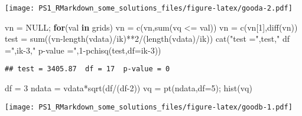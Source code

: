 \documentclass[
]{article}
\newenvironment{Shaded}{\begin{snugshade}}{\end{snugshade}}
\newcommand{\AttributeTok}[1]{\textcolor[rgb]{0.77,0.63,0.00}{#1}}
\newcommand{\ConstantTok}[1]{\textcolor[rgb]{0.00,0.00,0.00}{#1}}
\newcommand{\ControlFlowTok}[1]{\textcolor[rgb]{0.13,0.29,0.53}{\textbf{#1}}}
\newcommand{\DecValTok}[1]{\textcolor[rgb]{0.00,0.00,0.81}{#1}}
\newcommand{\FunctionTok}[1]{\textcolor[rgb]{0.00,0.00,0.00}{#1}}
\newcommand{\NormalTok}[1]{#1}
\newcommand{\OtherTok}[1]{\textcolor[rgb]{0.56,0.35,0.01}{#1}}
\newcommand{\SpecialCharTok}[1]{\textcolor[rgb]{0.00,0.00,0.00}{#1}}
\newcommand{\StringTok}[1]{\textcolor[rgb]{0.31,0.60,0.02}{#1}}
\begin{document}
\texttt{[image: PS1\_RMarkdown\_some\_solutions\_files/figure-latex/gooda-2.pdf]}

\begin{Shaded}
\begin{Highlighting}[]
\NormalTok{vn }\OtherTok{=} \ConstantTok{NULL}\NormalTok{; }\ControlFlowTok{for}\NormalTok{(val }\ControlFlowTok{in}\NormalTok{ grids) vn }\OtherTok{=} \FunctionTok{c}\NormalTok{(vn,}\FunctionTok{sum}\NormalTok{(vq }\SpecialCharTok{\textless{}=}\NormalTok{ val))}
\NormalTok{vn }\OtherTok{=} \FunctionTok{c}\NormalTok{(vn[}\DecValTok{1}\NormalTok{],}\FunctionTok{diff}\NormalTok{(vn))}
\NormalTok{test }\OtherTok{=} \FunctionTok{sum}\NormalTok{((vn}\SpecialCharTok{{-}}\FunctionTok{length}\NormalTok{(vdata)}\SpecialCharTok{/}\NormalTok{ik)}\SpecialCharTok{**}\DecValTok{2}\SpecialCharTok{/}\NormalTok{(}\FunctionTok{length}\NormalTok{(vdata)}\SpecialCharTok{/}\NormalTok{ik))}
\FunctionTok{cat}\NormalTok{(}\StringTok{"test ="}\NormalTok{,test,}\StringTok{" df ="}\NormalTok{,ik}\DecValTok{{-}3}\NormalTok{,}\StringTok{" p{-}value ="}\NormalTok{,}\DecValTok{1}\SpecialCharTok{{-}}\FunctionTok{pchisq}\NormalTok{(test,}\AttributeTok{df=}\NormalTok{ik}\DecValTok{{-}3}\NormalTok{))}
\end{Highlighting}
\end{Shaded}

\begin{verbatim}
## test = 3405.87  df = 17  p-value = 0
\end{verbatim}

\begin{Shaded}
\begin{Highlighting}[]
\NormalTok{df }\OtherTok{=} \DecValTok{3}
\NormalTok{ndata }\OtherTok{=}\NormalTok{ vdata}\SpecialCharTok{*}\FunctionTok{sqrt}\NormalTok{(df}\SpecialCharTok{/}\NormalTok{(df}\DecValTok{{-}2}\NormalTok{))}
\NormalTok{vq }\OtherTok{=} \FunctionTok{pt}\NormalTok{(ndata,}\AttributeTok{df=}\DecValTok{5}\NormalTok{); }\FunctionTok{hist}\NormalTok{(vq)}
\end{Highlighting}
\end{Shaded}

\texttt{[image: PS1\_RMarkdown\_some\_solutions\_files/figure-latex/goodb-1.pdf]}
\end{document}
